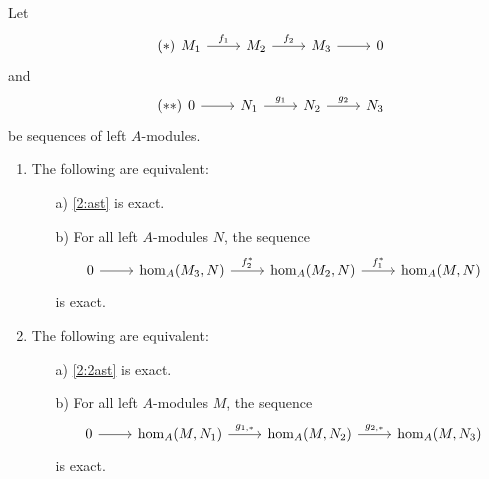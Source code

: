 \begin{prop}
  Let
  \begin{equation}\tag{$\ast$}\label{2:ast}
    \begin{tikzcd}
      M_1\ar{r}{f_1}&M_2\ar{r}{f_2}&M_3\ar{r}&0
    \end{tikzcd}
  \end{equation}
  and
  \begin{equation}\tag{$\ast\ast$}\label{2:2ast}
    \begin{tikzcd}
      0\ar{r}&N_1\ar{r}{g_1}&N_2\ar{r}{g_2}&N_3
    \end{tikzcd}
  \end{equation}
  be sequences of left $A$-modules.
  \begin{enumerate}
    \item The following are equivalent:
      \begin{enumerate}
        \item[a)] \eqref{2:ast} is exact.
        \item[b)] For all left $A$-modules $N$, the sequence
        \[
        \begin{tikzcd}
        0\ar{r}&\hom_A(M_3,N)\ar{r}{f_2^{\ast}}& \hom_A(M_2,N)\ar{r}{f_1^{\ast}} &\hom_A(M,N)
        \end{tikzcd}
        \]
        is exact.
      \end{enumerate}
    \item The following are equivalent:
      \begin{enumerate}
        \item[a)] \eqref{2:2ast} is exact.
        \item[b)] For all left $A$-modules $M$, the sequence
        \[
        \begin{tikzcd}
          0\ar{r}&\hom_A(M,N_1)\ar{r}{g_{1,\ast}}& \hom_A(M,N_2)\ar{r}{g_{2,\ast}}&\hom_A(M,N_3)
        \end{tikzcd}
        \]
        is exact.
      \end{enumerate}
  \end{enumerate}
  \end{prop}
